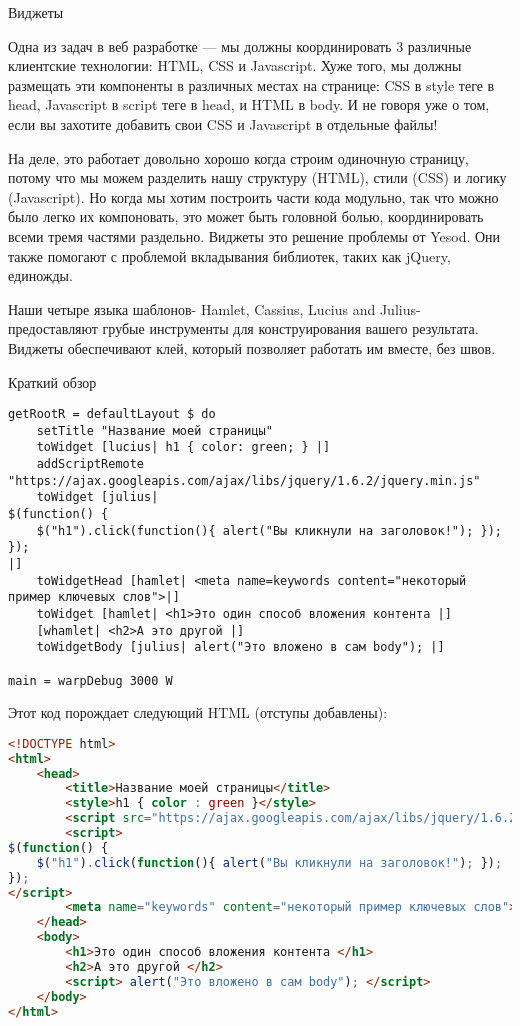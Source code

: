 Виджеты

Одна из задач в веб разработке — мы должны координировать 3 различные клиентские технологии: HTML, CSS и Javascript. Хуже того, мы должны размещать эти компоненты в различных местах на странице: CSS в style теге в head, Javascript в script теге в head, и HTML в body. И не говоря уже о том, если вы захотите добавить свои CSS и Javascript в отдельные файлы! 

На деле, это работает довольно хорошо когда строим одиночную страницу, потому что мы можем разделить нашу структуру (HTML), стили (CSS) и логику (Javascript). Но когда мы хотим построить части кода модульно, так что можно было легко их компоновать, это может быть головной болью, координировать всеми тремя частями раздельно. Виджеты это решение проблемы от Yesod. Они также помогают с проблемой вкладывания библиотек, таких как jQuery, единожды.

Наши четыре языка шаблонов- Hamlet, Cassius, Lucius and Julius- предоставляют грубые инструменты для конструирования вашего результата. Виджеты обеспечивают клей, который позволяет работать им вместе, без швов.

Краткий обзор

\begin{lstlisting}
getRootR = defaultLayout $ do
    setTitle "Название моей страницы"
    toWidget [lucius| h1 { color: green; } |]
    addScriptRemote "https://ajax.googleapis.com/ajax/libs/jquery/1.6.2/jquery.min.js"
    toWidget [julius|
$(function() {
    $("h1").click(function(){ alert("Вы кликнули на заголовок!"); });
});
|]
    toWidgetHead [hamlet| <meta name=keywords content="некоторый пример ключевых слов">|]
    toWidget [hamlet| <h1>Это один способ вложения контента |]
    [whamlet| <h2>А это другой |]
    toWidgetBody [julius| alert("Это вложено в сам body"); |]

main = warpDebug 3000 W
\end{lstlisting}

Этот код порождает следующий HTML (отступы добавлены):

\begin{lstlisting}[language=HTML]
<!DOCTYPE html> 
<html>
    <head>
        <title>Название моей страницы</title>
        <style>h1 { color : green }</style>
        <script src="https://ajax.googleapis.com/ajax/libs/jquery/1.6.2/jquery.min.js"></script>
        <script>
$(function() {
    $("h1").click(function(){ alert("Вы кликнули на заголовок!"); });
});
</script>
        <meta name="keywords" content="некоторый пример ключевых слов">
    </head>
    <body>
        <h1>Это один способ вложения контента </h1>
        <h2>А это другой </h2>
        <script> alert("Это вложено в сам body"); </script>
    </body>
</html>
\end{lstlisting}

